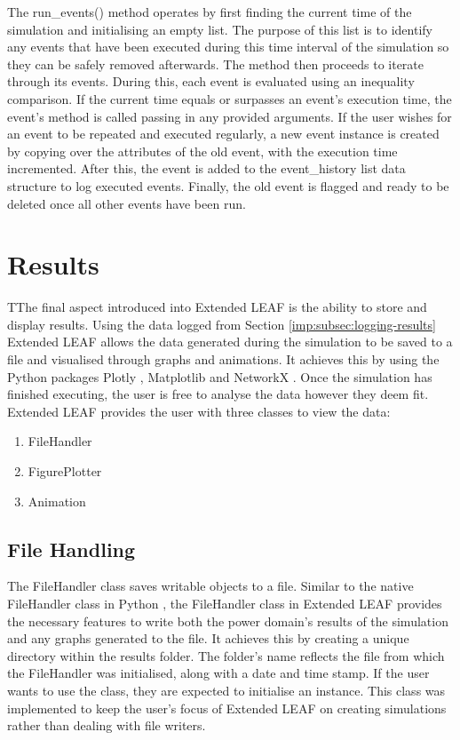 \documentclass{l4proj}
\begin{document}
The run\_events() method operates by first finding the current time of the simulation and initialising an empty list.
The purpose of this list is to identify any events that have been executed during this time interval of the simulation so they can be safely removed afterwards.
The method then proceeds to iterate through its events.
During this, each event is evaluated using an inequality comparison.
If the current time equals or surpasses an event's execution time, the event's method is called passing in any provided arguments.
If the user wishes for an event to be repeated and executed regularly, a new event instance is created by copying over the attributes of the old event, with the execution time incremented.
After this, the event is added to the event\_history list data structure to log executed events.
Finally, the old event is flagged and ready to be deleted once all other events have been run.

\section{Results}\label{sec:displaying-results}
TThe final aspect introduced into Extended LEAF is the ability to store and display results.
Using the data logged from Section \ref{imp:subsec:logging-results} Extended LEAF allows the data generated during the simulation to be saved to a file and visualised through graphs and animations.
It achieves this by using the Python packages Plotly \citep{plotly-git}, Matplotlib \citep{Hunter:2007} and NetworkX \citep{networkx}.
Once the simulation has finished executing, the user is free to analyse the data however they deem fit.
Extended LEAF provides the user with three classes to view the data:

\begin{enumerate}
    \item FileHandler
    \item FigurePlotter
    \item Animation
\end{enumerate}

\subsection{File Handling}\label{subsec:imp:filehandler}
The FileHandler class saves writable objects to a file.
Similar to the native FileHandler class in Python \citep{python-docs-FileHandler}, the FileHandler class in Extended LEAF provides the necessary features to write both the power domain's results of the simulation and any graphs generated to the file.
It achieves this by creating a unique directory within the results folder. The folder's name reflects the file from which the FileHandler was initialised, along with a date and time stamp.
If the user wants to use the class, they are expected to initialise an instance.
This class was implemented to keep the user's focus of Extended LEAF on creating simulations rather than dealing with file writers.
\end{document}
